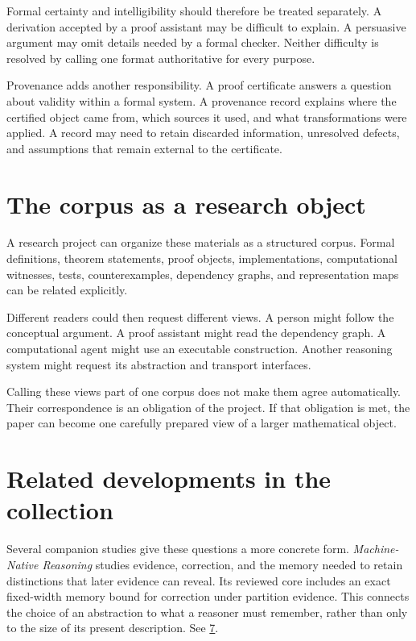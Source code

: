 \documentclass[11pt,oneside,openany]{book}
\begin{document}
Formal certainty and intelligibility should therefore be treated separately. A derivation accepted by a proof assistant may be difficult to explain. A persuasive argument may omit details needed by a formal checker. Neither difficulty is resolved by calling one format authoritative for every purpose.

Provenance adds another responsibility. A proof certificate answers a question about validity within a formal system. A provenance record explains where the certified object came from, which sources it used, and what transformations were applied. A record may need to retain discarded information, unresolved defects, and assumptions that remain external to the certificate.

\section{The corpus as a research object}
A research project can organize these materials as a structured corpus. Formal definitions, theorem statements, proof objects, implementations, computational witnesses, tests, counterexamples, dependency graphs, and representation maps can be related explicitly.

Different readers could then request different views. A person might follow the conceptual argument. A proof assistant might read the dependency graph. A computational agent might use an executable construction. Another reasoning system might request its abstraction and transport interfaces.

Calling these views part of one corpus does not make them agree automatically. Their correspondence is an obligation of the project. If that obligation is met, the paper can become one carefully prepared view of a larger mathematical object.

\section{Related developments in the collection}
Several companion studies give these questions a more concrete form. \emph{Machine-Native Reasoning} studies evidence, correction, and the memory needed to retain distinctions that later evidence can reveal. Its reviewed core includes an exact fixed-width memory bound for correction under partition evidence. This connects the choice of an abstraction to what a reasoner must remember, rather than only to the size of its present description. See \hyperlink{reference-7}{7}.
\end{document}
